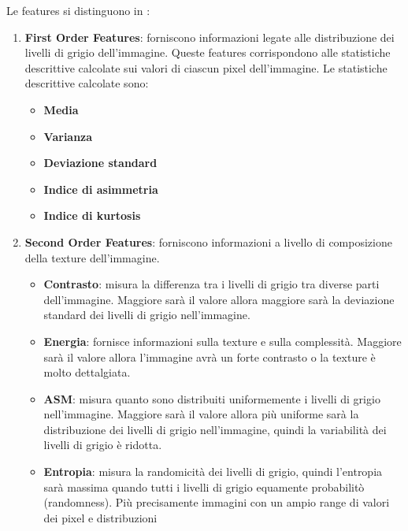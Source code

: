 Le features si distinguono in \cite{explanation-features}:
\begin{enumerate}
      \item \textbf{First Order Features}: forniscono informazioni legate alle
            distribuzione dei livelli di grigio dell'immagine. Queste features
            corrispondono alle statistiche descrittive calcolate sui valori di
            ciascun pixel dell'immagine. Le statistiche descrittive calcolate sono:
            \begin{itemize}
                  \item \textbf{Media}
                  \item \textbf{Varianza}
                  \item \textbf{Deviazione standard}
                  \item \textbf{Indice di asimmetria}
                  \item \textbf{Indice di kurtosis}
            \end{itemize}
      \item \textbf{Second Order Features}: forniscono informazioni a livello di
            composizione della texture dell'immagine.
            \begin{itemize}
                  \item \textbf{Contrasto}: misura la differenza tra i livelli di 
                  grigio tra diverse parti dell'immagine. Maggiore sarà il valore 
                  allora maggiore sarà la deviazione standard dei livelli di grigio
                  nell'immagine.
                  \item \textbf{Energia}: fornisce informazioni sulla texture e
                  sulla complessità. Maggiore sarà il valore allora l'immagine avrà
                  un forte contrasto o la texture è molto dettalgiata.
                  \item \textbf{ASM}: misura quanto sono distribuiti uniformemente i
                  livelli di grigio nell'immagine. Maggiore sarà il valore allora
                  più uniforme sarà la distribuzione dei livelli di grigio nell'immagine,
                  quindi la variabilità dei livelli di grigio è ridotta.
                  \item \textbf{Entropia}: misura la randomicità dei livelli di
                  grigio, quindi l'entropia sarà massima quando tutti i livelli 
                  di grigio equamente probabilitò (randomness). Più precisamente
                  immagini con un ampio range di valori dei pixel e distribuzioni

\end{itemize}
\end{enumerate}
